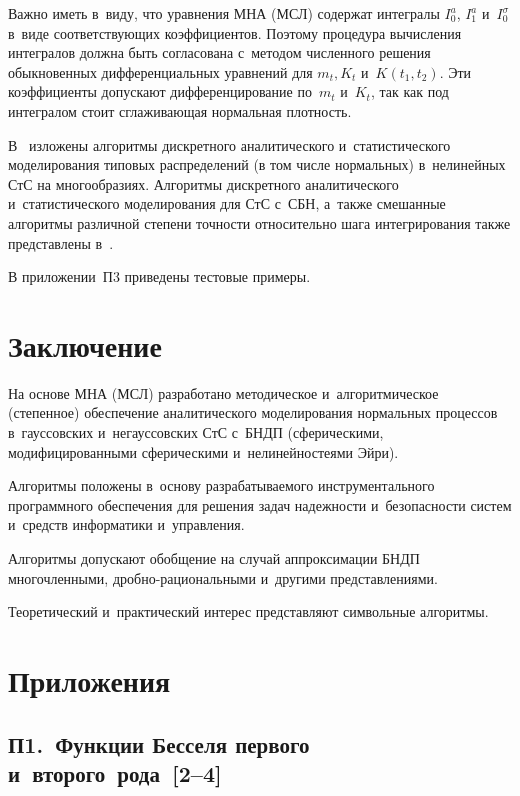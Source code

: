 \begin{multicols}{2}
Важно иметь в~виду, что уравнения МНА (МСЛ) содержат интегралы 
$I_0^a$, $I_1^a$ и~$I_0^\sigma$ в~виде соответствующих коэффициентов. 
Поэтому процедура вычисления интегралов должна быть согласована с~методом 
численного решения обыкновенных дифференциальных уравнений для  $m_t, K_t$ 
и~$K(t_1, t_2)$. Эти коэффициенты допускают дифференцирование по~$m_t$ 
и~$K_t$, так как под интегралом стоит сглаживающая нормальная плот\-ность.


В~\cite{8-sin} изложены алгоритмы дискретного аналитического и~статистического
моделирования типовых распределений (в том числе нормальных) в~нелинейных
СтС на многообразиях. Алгоритмы дискретного аналитического и~статистического
моделирования для СтС с~СБН, а~также смешанные алгоритмы различной
степени точности относительно шага интегрирования также представлены в~\cite{8-sin}.

В приложении~П3  приведены тестовые при\-меры.

\section{Заключение}

На основе МНА (МСЛ) разработано методическое и~алгоритмическое (степенное) 
обеспечение аналитического моделирования нормальных 
процессов в~гауссовских и~негауссовских СтС с~\mbox{БНДП} (сферическими, модифицированными 
сферическими и~нелинейностеями Эйри).

Алгоритмы положены в~основу разрабатываемого инструментального программного 
обеспечения для решения задач надежности и~безопасности сис\-тем и~средств 
информатики и~управления.

Алгоритмы допускают обобщение на случай аппроксимации 
БНДП многочленными, дроб\-но-ра\-ци\-о\-наль\-ны\-ми и~другими представлениями.

Теоретический и~практический интерес представляют символьные алгоритмы.

\vspace*{12pt}


{\small


 \section*{\raggedleft Приложения}

 \vspace*{-6pt}


\subsection*{П1.\ Функции Бесселя первого \hphantom{П1.\ }и~второго~рода~[2--4]}


}
\end{multicols}

